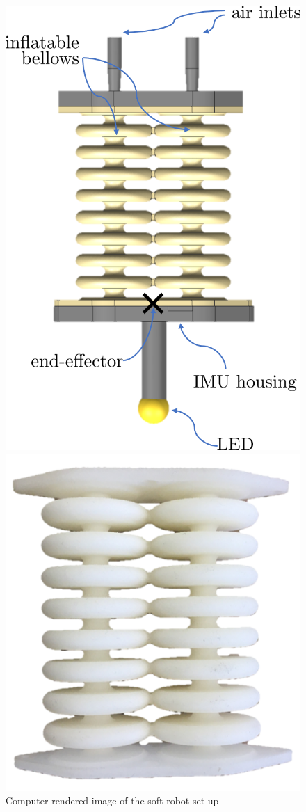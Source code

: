 \begin{figure}[H]
\begin{minipage}{.5\textwidth}
  \centering
  \includegraphics[width = 0.8\linewidth]{Figures/Chapter1/completesetup2.png}
  \caption{Computer rendered image of the soft robot set-up }
  \label{fig:test1}
\end{minipage}
\begin{minipage}{.5\textwidth}
  \centering
  \includegraphics[width =0.8\linewidth]{Figures/Chapter1/actuator.png}

\end{minipage}
\end{figure}
